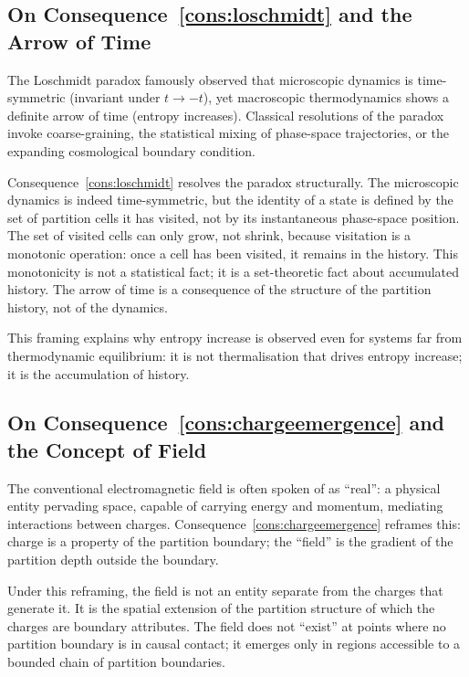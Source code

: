 \documentclass[11pt,twocolumn,a4paper]{article}
\theoremstyle{axiomstyle}
\theoremstyle{conseqstyle}
\theoremstyle{definition}
\theoremstyle{remark}
\begin{document}
\subsection{On Consequence~\ref{cons:loschmidt} and the Arrow of Time}

The Loschmidt paradox famously observed that microscopic dynamics is time-symmetric (invariant under $t\to -t$), yet macroscopic thermodynamics shows a definite arrow of time (entropy increases). Classical resolutions of the paradox invoke coarse-graining, the statistical mixing of phase-space trajectories, or the expanding cosmological boundary condition.

Consequence~\ref{cons:loschmidt} resolves the paradox structurally. The microscopic dynamics is indeed time-symmetric, but the identity of a state is defined by the set of partition cells it has visited, not by its instantaneous phase-space position. The set of visited cells can only grow, not shrink, because visitation is a monotonic operation: once a cell has been visited, it remains in the history. This monotonicity is not a statistical fact; it is a set-theoretic fact about accumulated history. The arrow of time is a consequence of the structure of the partition history, not of the dynamics.

This framing explains why entropy increase is observed even for systems far from thermodynamic equilibrium: it is not thermalisation that drives entropy increase; it is the accumulation of history.

\subsection{On Consequence~\ref{cons:chargeemergence} and the Concept of Field}

The conventional electromagnetic field is often spoken of as ``real'': a physical entity pervading space, capable of carrying energy and momentum, mediating interactions between charges. Consequence~\ref{cons:chargeemergence} reframes this: charge is a property of the partition boundary; the ``field'' is the gradient of the partition depth outside the boundary.

Under this reframing, the field is not an entity separate from the charges that generate it. It is the spatial extension of the partition structure of which the charges are boundary attributes. The field does not ``exist'' at points where no partition boundary is in causal contact; it emerges only in regions accessible to a bounded chain of partition boundaries.
\end{document}
